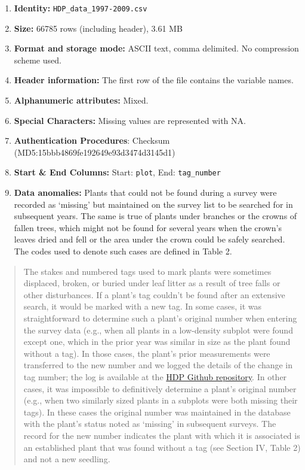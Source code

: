 \documentclass[
  12pt,
  man, donotrepeattitle]{apa6}
\begin{document}
\begin{enumerate}
\def\labelenumi{\arabic{enumi}.}
\item
  \textbf{Identity:} \texttt{HDP\_data\_1997-2009.csv}
\item
  \textbf{Size:} 66785 rows (including header), 3.61 MB
\item
  \textbf{Format and storage mode:} ASCII text, comma delimited. No compression scheme used.
\item
  \textbf{Header information:} The first row of the file contains the variable names.
\item
  \textbf{Alphanumeric attributes:} Mixed.
\item
  \textbf{Special Characters:} Missing values are represented with NA.
\item
  \textbf{Authentication Procedures}: Checksum (MD5:15bbb4869fe192649e93d3474d3145d1)
\item
  \textbf{Start \& End Columns:} Start: \texttt{plot}, End: \texttt{tag\_number}
\item
  \textbf{Data anomalies:} Plants that could not be found during a survey were recorded as `missing' but maintained on the survey list to be searched for in subsequent years. The same is true of plants under branches or the crowns of fallen trees, which might not be found for several years when the crown's leaves dried and fell or the area under the crown could be safely searched. The codes used to denote such cases are defined in Table 2.
\end{enumerate}

\begin{quote}
The stakes and numbered tags used to mark plants were sometimes displaced, broken, or buried under leaf litter as a result of tree falls or other disturbances. If a plant's tag couldn't be found after an extensive search, it would be marked with a new tag. In some cases, it was straightforward to determine such a plant's original number when entering the survey data (e.g., when all plants in a low-density subplot were found except one, which in the prior year was similar in size as the plant found without a tag). In those cases, the plant's prior measurements were transferred to the new number and we logged the details of the change in tag number; the log is available at the \href{https://github.com/BrunaLab/HeliconiaSurveys}{HDP Github repository}. In other cases, it was impossible to definitively determine a plant's original number (e.g., when two similarly sized plants in a subplots were both missing their tags). In these cases the original number was maintained in the database with the plant's status noted as `missing' in subsequent surveys. The record for the new number indicates the plant with which it is associated is an established plant that was found without a tag (see Section IV, Table 2) and not a new seedling.
\end{quote}
\end{document}
